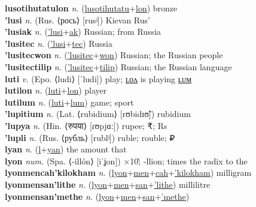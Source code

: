 \textbf{lusotihutatulon} \textit{n.} (\hyperref[lusotihutatu]{lusotihutatu}+\hyperref[lon]{lon})
bronze \label{lusotihutatulon} \\
\textbf{'lusi} \textit{n.} (Rus. ⟨рось⟩ [rusʲ])
Kievan Rus' \label{'lusi} \\
\textbf{'lusiak} \textit{n.} (\hyperref['lusi]{'lusi}+\hyperref[ak]{ak})
Russian; from Russia \label{'lusiak} \\
\textbf{'lusitec} \textit{n.} (\hyperref['lusi]{'lusi}+\hyperref[tec]{tec})
Russia \label{'lusitec} \\
\textbf{'lusitecwon} \textit{n.} (\hyperref['lusitec]{'lusitec}+\hyperref[won]{won})
Russian; the Russian people \label{'lusitecwon} \\
\textbf{'lusitectilip} \textit{n.} (\hyperref['lusitec]{'lusitec}+\hyperref[tilip]{tilip})
Russian; the Russian language \label{'lusitectilip} \\
\textbf{luti} \textit{v.} (Epo. ⟨ludi⟩ [ˈludi])
play; \hyperref[lutilon]{ʟᴏᴧ} is playing \hyperref[lutilum]{ʟᴜᴍ} \label{luti} \\
\textbf{lutilon} \textit{n.} (\hyperref[luti]{luti}+\hyperref[lon]{lon})
player \label{lutilon} \\
\textbf{lutilum} \textit{n.} (\hyperref[luti]{luti}+\hyperref[lum]{lum})
game; sport \label{lutilum} \\
\textbf{'lupitium} \textit{n.} (Lat. ⟨rubidium⟩ [rʊbidɪʊ̃])
rubidium \label{'lupitium} \\
\textbf{'lupya} \textit{n.} (Hin. ⟨रुपया⟩ [ɾʊpjɑː])
rupee; ₹; Rs \label{'lupya} \\
\textbf{'lupli} \textit{n.} (Rus. ⟨рубль⟩ [rublʲ])
ruble; rouble; ₽ \label{'lupli} \\
\textbf{lyan} \textit{n.} (\hyperref[l]{l}+\hyperref[an]{yan})
the amount that \label{lyan} \\
\textbf{lyon} \textit{num.} (Spa. ⟨-illón⟩ [iˈʝon])
×10\^; -llion; times the radix to the \label{lyon} \\
\textbf{lyonmencah'kilokham} \textit{n.} (\hyperref[lyon]{lyon}+\hyperref[men]{men}+\hyperref[cah]{cah}+\hyperref['kilokham]{'kilokham})
milligram \label{lyonmencah'kilokham} \\
\textbf{lyonmensan'lithe} \textit{n.} (\hyperref[lyon]{lyon}+\hyperref[men]{men}+\hyperref[san]{san}+\hyperref['lithe]{'lithe})
millilitre \label{lyonmensan'lithe} \\
\textbf{lyonmensan'methe} \textit{n.} (\hyperref[lyon]{lyon}+\hyperref[men]{men}+\hyperref[san]{san}+\hyperref['methe]{'methe})
